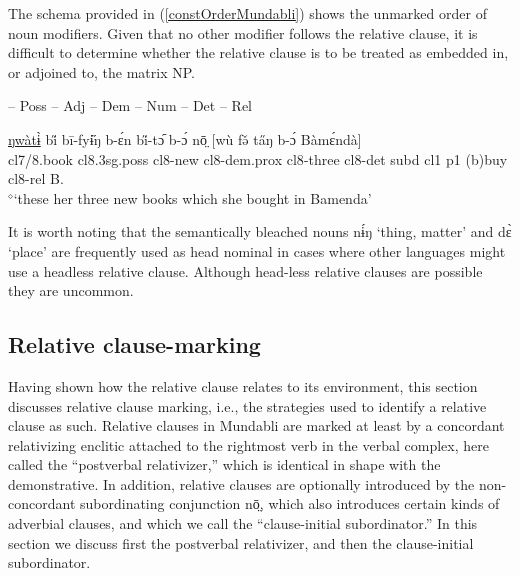 \documentclass[10pt,twoside]{article}
\def\ci#1{{\ipaFont #1}}
\newcommand{\gl}[1]{`#1'}
\def\VSP{\vspace{0pt}}
\newcommand{\cl}[1]{{\sc cl#1}}
\newcommand{\pref}[1]{(\ref{#1})}
\def\elicited{$^\diamond$}
\newcommand{\comment}[1]{\textcolor{blue}{\emph{#1}}}
\begin{document}
The schema provided in \pref{constOrderMundabli} shows the unmarked order of noun modifiers. 
Given that no other modifier follows the relative clause, it is difficult to determine 
whether the relative clause is to be treated as embedded in, or adjoined to, the matrix NP.

\begin{exe}
	 -- {\sc Poss} -- {\sc Adj} -- {\sc Dem} -- {\sc Num} -- {\sc Det} -- {\sc Rel}	\label{constOrderMundabli}
	
	\ex \gll 	\uline{ŋwàtɨ̀} bi̋ bī-fyɨ̋ŋ b-ɛ́n bi̋-tɔ᷇ b-ɔ́ nō̤ [wù fə̌ ta̋ŋ b-ɔ́ Bàmɛ́ndà]		\\
			\cl7/8.book \cl8.{\sc 3sg.poss} \cl8-new \cl8-{\sc dem.prox} \cl8-three \cl8-{\sc det} {\sc subd} \cl1  {\sc p1} ({\sc b})buy \cl8-{\sc rel} B. 		\\
\glt \VSP \elicited \gl{these her three new books which she bought in Bamenda}\label{exTheseHerThreeBooks}
\end{exe}%

It is worth noting that the semantically bleached nouns \ci{nɨ́ŋ} \gl{thing, matter} 
and \ci{dɛ̀} \gl{place} are frequently used as head nominal in cases where other languages might use a headless relative clause. 
Although head-less relative clauses are possible they are uncommon.
%

\subsection{Relative clause-marking}\label{secMundabliRelativizer}

Having shown how the relative clause relates to its environment, this section discusses 
relative clause marking, i.e., the strategies used to identify a relative clause as such. 
Relative clauses in Mundabli are marked at least by a concordant relativizing enclitic attached
to the rightmost verb in the verbal complex, here called the ``postverbal relativizer,'' 
which is identical in shape with the demonstrative.
In addition, relative clauses are optionally introduced by the non-concordant subordinating conjunction \ci{nō̤}, 
which also introduces certain kinds of adverbial clauses, and which we call the ``clause-initial subordinator.'' 
In this section we discuss first the postverbal relativizer,
and then the clause-initial subordinator.
\end{document}
